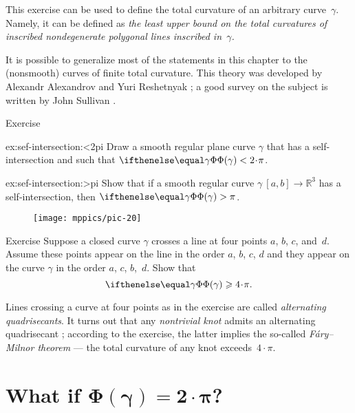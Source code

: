 This exercise can be used to define the total curvature of an arbitrary curve~$\gamma$.
Namely, it can be defined as {}\textit{the least upper bound on the total curvatures of inscribed nondegenerate polygonal lines inscribed in~$\gamma$.}

It is possible to generalize most of the statements in this chapter to the (nonsmooth) curves of finite total curvature.
This theory was developed by Alexandr Alexandrov and Yuri Reshetnyak \cite{aleksandrov-reshetnyak};
a good survey on the subject is written by John Sullivan \cite{sullivan-curves}.

\begin{thm}{Exercise}\label{ex:sef-intersection}

\begin{subthm}{ex:sef-intersection:<2pi}
Draw a smooth regular plane curve $\gamma$ that has a self-intersection and such that $\tc\gamma<2\cdot\pi$.
\end{subthm}

\begin{subthm}{ex:sef-intersection:>pi} Show that if a smooth regular curve $\gamma\:[a,b]\to\mathbb{R}^3$ has a self-intersection, then $\tc\gamma>\pi$.
\end{subthm}

\end{thm}

\begin{wrapfigure}{r}{30 mm}
\vskip-2mm
\centering
\texttt{[image: mppics/pic-20]}
\vskip0mm
\end{wrapfigure}

\begin{thm}{Exercise}\label{ex:quadrisecant}
Suppose a closed curve $\gamma$ crosses a line at four points $a$, $b$, $c$, and~$d$.
Assume these points appear on the line in the order $a$, $b$, $c$, $d$
and they appear on the curve $\gamma$ in the order $a$, $c$, $b$,~$d$.
Show that 
\[\tc\gamma\ge 4\cdot\pi.\]

\end{thm}

Lines crossing a curve at four points as in the exercise are called \emph{alternating quadrisecants}.
It turns out that any {}\emph{nontrivial knot} admits an alternating quadrisecant \cite{denne};
according to the exercise, the latter implies the so-called \emph{F\'ary--Milnor theorem} --- the total curvature of any knot exceeds~$4\cdot \pi$.

\section[\texorpdfstring{What if $\Phi(\gamma)=2\cdot \pi$?}{What if Φ(γ)=2·π?}]{What if $\bm{\Phi(\gamma)=2\cdot \pi}$?}

